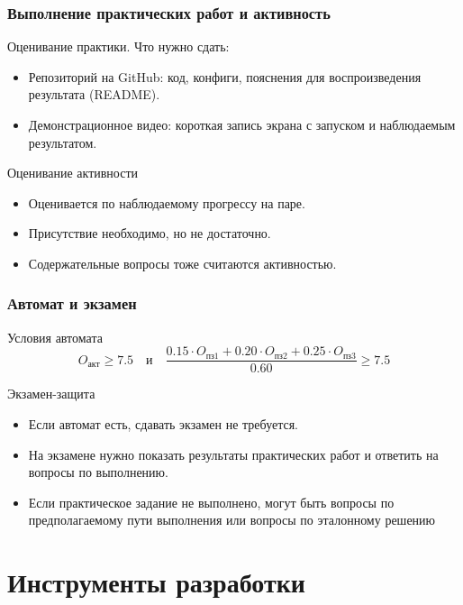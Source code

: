 \documentclass[aspectratio=169]{beamer}
\begin{document}
\begin{frame}
\frametitle{Выполнение практических работ и активность}
\begin{block}{Оценивание практики. Что нужно сдать:}
\begin{itemize}
	\item Репозиторий на GitHub: код, конфиги, пояснения для воспроизведения результата (README).
	\item Демонстрационное видео: короткая запись экрана с запуском и наблюдаемым результатом.
\end{itemize}
\end{block}
\begin{block}{Оценивание активности}
	\begin{itemize}
	\item Оценивается по наблюдаемому прогрессу на паре.
	\item Присутствие необходимо, но не достаточно.
	\item Содержательные вопросы тоже считаются активностью.
\end{itemize}
\end{block}
\end{frame}

\begin{frame}
\frametitle{Автомат и экзамен}
\begin{block}{Условия автомата}
\[
	O_{\text{акт}} \ge 7.5
	\quad \text{и} \quad
	\frac{0.15 \cdot O_{\text{пз1}} + 0.20 \cdot  O_{\text{пз2}} + 0.25 \cdot  O_{\text{пз3}}}{0.60} \ge 7.5
\]
\end{block}
\begin{block}{Экзамен-защита}
\begin{itemize}
	\item Если автомат есть, сдавать экзамен не требуется.
	\item На экзамене нужно показать результаты практических работ и ответить на вопросы по выполнению.
	\item Если практическое задание не выполнено, могут быть вопросы по предполагаемому пути выполнения или вопросы по эталонному решению
\end{itemize}
\end{block}
\end{frame}

\section{Инструменты разработки}
\end{document}
